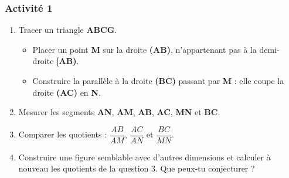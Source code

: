 \documentclass[12pt,a4paper]{article}
\begin{document}
\subsubsection*{\color{myred} Activité 1}
\begin{enumerate}
    \item Tracer un triangle \textbf{ABCG}.
    \begin{itemize}
        \item[\textbullet] Placer un point \textbf{M} sur la droite \textbf{(AB)}, n'appartenant pas à la demi-droite \textbf{[AB)}.
        \item[\textbullet] Construire la parallèle à la droite \textbf{(BC)} passant par \textbf{M} : elle coupe la droite \textbf{(AC)} en \textbf{N}.
    \end{itemize}
    
    \item Mesurer les segments \textbf{AN}, \textbf{AM}, \textbf{AB}, \textbf{AC}, \textbf{MN} et \textbf{BC}.
    
    \item Comparer les quotients : $\dfrac{AB}{AM}$, $\dfrac{AC}{AN}$ et $\dfrac{BC}{MN}$.
    
    \item Construire une figure semblable avec d'autres dimensions et calculer à nouveau les quotients de la question 3. Que peux-tu conjecturer ?
\end{enumerate}
\begin{center}
\end{center}
\end{document}
